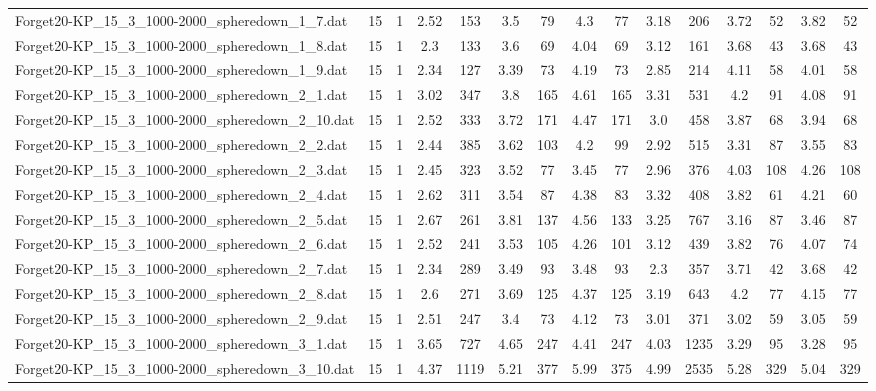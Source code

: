\begin{table}[!ht]
{\begin{tabular}{lcccccccccccccc}
Forget20-KP\_15\_3\_1000-2000\_spheredown\_1\_7.dat & 15 & 1 & 2.52 & 153 & 3.5 & 79 & 4.3 & 77 & 3.18 & 206 & 3.72 & 52 & 3.82 & 52 \\
Forget20-KP\_15\_3\_1000-2000\_spheredown\_1\_8.dat & 15 & 1 & 2.3 & 133 & 3.6 & 69 & 4.04 & 69 & 3.12 & 161 & 3.68 & 43 & 3.68 & 43 \\
Forget20-KP\_15\_3\_1000-2000\_spheredown\_1\_9.dat & 15 & 1 & 2.34 & 127 & 3.39 & 73 & 4.19 & 73 & 2.85 & 214 & 4.11 & 58 & 4.01 & 58 \\
Forget20-KP\_15\_3\_1000-2000\_spheredown\_2\_1.dat & 15 & 1 & 3.02 & 347 & 3.8 & 165 & 4.61 & 165 & 3.31 & 531 & 4.2 & 91 & 4.08 & 91 \\
Forget20-KP\_15\_3\_1000-2000\_spheredown\_2\_10.dat & 15 & 1 & 2.52 & 333 & 3.72 & 171 & 4.47 & 171 & 3.0 & 458 & 3.87 & 68 & 3.94 & 68 \\
Forget20-KP\_15\_3\_1000-2000\_spheredown\_2\_2.dat & 15 & 1 & 2.44 & 385 & 3.62 & 103 & 4.2 & 99 & 2.92 & 515 & 3.31 & 87 & 3.55 & 83 \\
Forget20-KP\_15\_3\_1000-2000\_spheredown\_2\_3.dat & 15 & 1 & 2.45 & 323 & 3.52 & 77 & 3.45 & 77 & 2.96 & 376 & 4.03 & 108 & 4.26 & 108 \\
Forget20-KP\_15\_3\_1000-2000\_spheredown\_2\_4.dat & 15 & 1 & 2.62 & 311 & 3.54 & 87 & 4.38 & 83 & 3.32 & 408 & 3.82 & 61 & 4.21 & 60 \\
Forget20-KP\_15\_3\_1000-2000\_spheredown\_2\_5.dat & 15 & 1 & 2.67 & 261 & 3.81 & 137 & 4.56 & 133 & 3.25 & 767 & 3.16 & 87 & 3.46 & 87 \\
Forget20-KP\_15\_3\_1000-2000\_spheredown\_2\_6.dat & 15 & 1 & 2.52 & 241 & 3.53 & 105 & 4.26 & 101 & 3.12 & 439 & 3.82 & 76 & 4.07 & 74 \\
Forget20-KP\_15\_3\_1000-2000\_spheredown\_2\_7.dat & 15 & 1 & 2.34 & 289 & 3.49 & 93 & 3.48 & 93 & 2.3 & 357 & 3.71 & 42 & 3.68 & 42 \\
Forget20-KP\_15\_3\_1000-2000\_spheredown\_2\_8.dat & 15 & 1 & 2.6 & 271 & 3.69 & 125 & 4.37 & 125 & 3.19 & 643 & 4.2 & 77 & 4.15 & 77 \\
Forget20-KP\_15\_3\_1000-2000\_spheredown\_2\_9.dat & 15 & 1 & 2.51 & 247 & 3.4 & 73 & 4.12 & 73 & 3.01 & 371 & 3.02 & 59 & 3.05 & 59 \\
Forget20-KP\_15\_3\_1000-2000\_spheredown\_3\_1.dat & 15 & 1 & 3.65 & 727 & 4.65 & 247 & 4.41 & 247 & 4.03 & 1235 & 3.29 & 95 & 3.28 & 95 \\
Forget20-KP\_15\_3\_1000-2000\_spheredown\_3\_10.dat & 15 & 1 & 4.37 & 1119 & 5.21 & 377 & 5.99 & 375 & 4.99 & 2535 & 5.28 & 329 & 5.04 & 329 \\

\end{tabular}}
\end{table}
